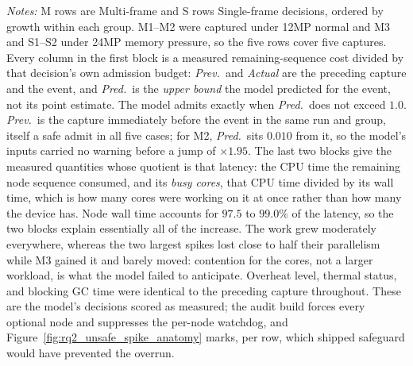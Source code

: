 \begin{table}[t]
  \par\vspace{2pt}
  \begin{minipage}{0.97\columnwidth}
    \scriptsize\emph{Notes:}
    M rows are Multi-frame and S rows Single-frame decisions, ordered by growth
    within each group.  M1--M2 were captured under 12MP normal and M3 and S1--S2
    under 24MP memory pressure, so the five rows cover five captures.
    Every column in the first block is a measured remaining-sequence cost
    divided by that decision's own admission budget: \emph{Prev.}\ and
    \emph{Actual} are the preceding capture and the event, and \emph{Pred.}\ is
    the \emph{upper bound} the model predicted for the event, not its point
    estimate.  The model admits exactly when \emph{Pred.}\ does not exceed
    \(1.0\).  \emph{Prev.}\ is the capture immediately before the event in the
    same run and group, itself a safe admit in all five cases; for M2,
    \emph{Pred.}\ sits \(0.010\) from it, so the model's inputs carried no
    warning before a jump of \(\times1.95\).
    The last two blocks give the measured quantities whose quotient is that
    latency: the CPU time the remaining node sequence consumed, and its
    \emph{busy cores}, that CPU time divided by its wall time, which is how many
    cores were working on it at once rather than how many the device has.  Node
    wall time accounts for \(97.5\) to \(99.0\)\% of the latency, so the two
    blocks explain essentially all of the increase.
    The work grew moderately everywhere, whereas the two largest spikes lost
    close to half their parallelism while M3 gained it and barely moved:
    contention for the cores, not a larger workload, is what the model failed to
    anticipate.  Overheat level, thermal status, and blocking GC time were
    identical to the preceding capture throughout.
    These are the model's decisions scored as measured; the audit build forces
    every optional node and suppresses the per-node watchdog, and
    Figure~\ref{fig:rq2_unsafe_spike_anatomy} marks, per row, which shipped
    safeguard would have prevented the overrun.
  \end{minipage}
\end{table}
